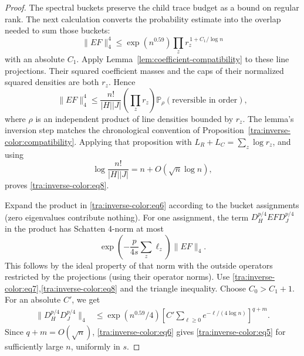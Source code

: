 \begin{proof}
The spectral buckets preserve the child trace budget as a bound on
regular rank. The next calculation converts the probability estimate
into the overlap needed to sum those buckets:
\begin{equation}
               \|E F\|_4^4\le
                  \exp(n^{0.59})\prod_{z} r_z^{\,1+C_1/\log n}                 \label{tra:inverse-color:eq8}
\end{equation}
with an absolute \(C_1\). Apply Lemma~\ref{lem:coefficient-compatibility} to these line
projections. Their squared coefficient masses and the caps of their
normalized squared densities are both $r_z$. Hence
\[
 \|EF\|_4^4\le\frac{n!}{|H||J|}
       \left(\prod_zr_z\right)
       \mathbb P_\rho(\text{reversible in order}),
\]
where $\rho$ is an independent product of line densities bounded by
$r_z$. The lemma's inversion step matches the chronological convention
of Proposition~\ref{tra:inverse-color:compatibility}. Applying that
proposition with $L_R+L_C=\sum_z\log r_z$, and using
\[
 \log\frac{n!}{|H||J|}=n+O(\sqrt n\log n),
\]
proves \eqref{tra:inverse-color:eq8}.

Expand the product in \eqref{tra:inverse-color:eq6} according to the bucket assignments (zero eigenvalues contribute nothing). For one assignment, the term \(D_H^{p/4} E F D_J^{p/4}\) in the product has Schatten 4-norm at most
\[
              \exp\left(-\frac{p}{4s}\sum_z\ell_z\right)\|E F\|_4.
\]
This follows by the ideal property of that norm with the outside operators restricted by the projections (using their operator norms). Use \eqref{tra:inverse-color:eq7},\eqref{tra:inverse-color:eq8} and the triangle inequality. Choose \(C_0>C_1+1\). For an absolute \(C'\), we get
\[
 \begin{split}
           \|D_H^{p/4}D_J^{p/4}\|_4
           &\le \exp(n^{0.59}/4)
              \left[C'\sum_{\ell\ge0}e^{-\ell/(4\log n)}\right]^{q+m}.
 \end{split}
\]
Since \(q+m=O(\sqrt n)\), \eqref{tra:inverse-color:eq6} gives \eqref{tra:inverse-color:eq5} for sufficiently large \(n\), uniformly in \(s\).
\end{proof}
